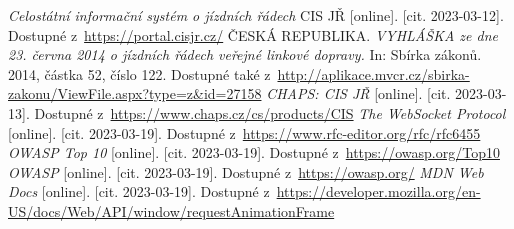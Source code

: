 \begin{thebibliography}{99}
     \textit{Celostátní informační systém o jízdních řádech} CIS JŘ [online]. [cit. 2023-03-12]. Dostupné z~\url{https://portal.cisjr.cz/}
     ČESKÁ REPUBLIKA. \textit{VYHLÁŠKA ze dne 23. června 2014 o jízdních řádech veřejné linkové dopravy.} In: Sbírka zákonů. 2014, částka 52, číslo 122. Dostupné také z~\url{http://aplikace.mvcr.cz/sbirka-zakonu/ViewFile.aspx?type=z&id=27158}
     \textit{CHAPS: CIS JŘ} [online]. [cit. 2023-03-13]. Dostupné z~\url{https://www.chaps.cz/cs/products/CIS}
     \textit{The WebSocket Protocol} [online]. [cit. 2023-03-19]. Dostupné z~\url{https://www.rfc-editor.org/rfc/rfc6455}
     \textit{OWASP Top 10} [online]. [cit. 2023-03-19]. Dostupné z~\url{https://owasp.org/Top10}
     \textit{OWASP} [online]. [cit. 2023-03-19]. Dostupné z~\url{https://owasp.org/}
     \textit{MDN Web Docs} [online]. [cit. 2023-03-19]. Dostupné z~\url{https://developer.mozilla.org/en-US/docs/Web/API/window/requestAnimationFrame}
\end{thebibliography}